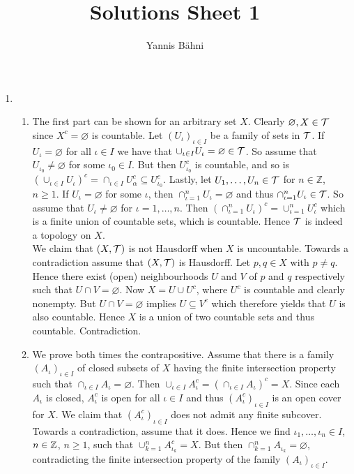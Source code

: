 

\title{Solutions Sheet 1}
\author{Yannis B\"{a}hni}
\address[Yannis B\"{a}hni]{University of Zurich, R\"{a}mistrasse 71, 8006 Zurich}


\maketitle
\thispagestyle{fancy}

\begin{enumerate}[label = \textbf{Exercise \arabic*.},wide = 0pt, itemsep=1.5ex]
\item ~ 
	\begin{enumerate}[label = \textbf{\alph*.},wide = 0pt, itemsep=1.5ex]
		\item The first part can be shown for an arbitrary set $X$. Clearly $\varnothing,X \in \mathcal{T}$ since $X^c = \varnothing$ is countable. Let $(U_\iota)_{\iota \in I}$ be a family of sets in $\mathcal{T}$. If $U_\iota = \varnothing$ for all $\iota \in I$ we have that $\cup_{\iota \in I} U_\iota = \varnothing \in \mathcal{T}$. So assume that $U_{\iota_0} \neq \varnothing$ for some $\iota_0 \in I$. But then $U^c_{\iota_0}$ is countable, and so is $(\cup_{\iota \in I} U_\iota)^c = \cap_{\iota \in I}U_\alpha^c \subseteq U^c_{\iota_0}$. Lastly, let $U_1,\dots,U_n \in \mathcal{T}$ for $n\in \mathbb{Z}$, $n \geq 1$. If $U_\iota = \varnothing$ for some $\iota$, then $\cap_{\iota = 1}^n U_\iota = \varnothing$ and thus $\cap_{\iota = 1}^n U_\iota \in \mathcal{T}$. So assume that $U_\iota \neq \varnothing$ for $\iota = 1,\dots,n$. Then $(\cap_{\iota = 1}^n U_\iota)^c = \cup_{\iota = 1}^n U_\iota^c$ which is a finite union of countable sets, which is countable. Hence $\mathcal{T}$ is indeed a topology on $X$.\\
			We claim that $(X,\mathcal{T})$ is not Hausdorff when $X$ is uncountable. Towards a contradiction assume that $(X,\mathcal{T})$ is Hausdorff. Let $p,q \in X$ with $p \neq q$. Hence there exist (open) neighbourhoods $U$ and $V$ of $p$ and $q$ respectively such that $U \cap V = \varnothing$. Now $X = U \cup U^c$, where $U^c$ is countable and clearly nonempty. But $U \cap V = \varnothing$ implies $U \subseteq V^c$ which therefore yields that $U$ is also countable. Hence $X$ is a union of two countable sets and thus countable. Contradiction.
		\item We prove both times the contrapositive. Assume that there is a family $(A_\iota)_{\iota \in I}$ of closed subsets of $X$ having the finite intersection property such that $\cap_{\iota \in I} A_\iota = \varnothing$. Then $\cup_{\iota \in I} A^c_\iota = (\cap_{\iota \in I} A_\iota)^c = X$. Since each $A_\iota$ is closed, $A_\iota^c$ is open for all $\iota \in I$ and thus $(A^c_\iota)_{\iota \in I}$ is an open cover for $X$. We claim that $(A_\iota^c)_{\iota \in I}$ does not admit any finite subcover. Towards a contradiction, assume that it does. Hence we find $\iota_1,\dots,\iota_n \in I$, $n \in \mathbb{Z}$, $n \geq 1$, such that $\cup_{k = 1}^n A_{\iota_k}^c = X$. But then $\cap_{k = 1}^n A_{\iota_k} = \varnothing$, contradicting the finite intersection property of the family $(A_\iota)_{\iota \in I}$.\\

\end{enumerate}
\end{enumerate}

